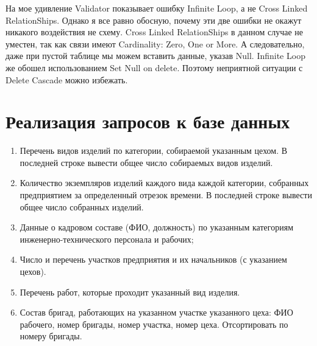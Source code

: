На мое удивление Validator показывает ошибку Infinite Loop, а не Cross Linked RelationShips.
Однако я все равно обосную, почему эти две ошибки не окажут никакого воздействия не схему.
Cross Linked RelationShips в данном случае не уместен, так как связи имеют Cardinality: Zero, One or More.
А следовательно, даже при пустой таблице мы можем вставить данные, указав Null.
Infinite Loop же обошел использованием Set Null on delete.
Поэтому неприятной ситуации с Delete Cascade можно избежать.

\section{Реализация запросов к базе данных}
\begin{enumerate}

    \item Перечень видов изделий по категории, собираемой указанным цехом.
    В последней строке вывести общее число собираемых видов изделий.

    

    \item Количество экземпляров изделий каждого вида каждой категории, собранных предприятием за определенный отрезок времени.
    В последней строке вывести общее число собранных изделий.

    

    \item Данные о кадровом составе (ФИО, должность) по указанным категориям инженерно-технического персонала и рабочих;

    

    \item Число и перечень участков предприятия и их начальников (с указанием цехов).

    

    \item Перечень работ, которые проходит указанный вид изделия.

    

    \item Состав бригад, работающих на указанном участке указанного цеха: ФИО рабочего, номер бригады, номер участка, номер цеха. Отсортировать по номеру бригады.

    


\end{enumerate}

